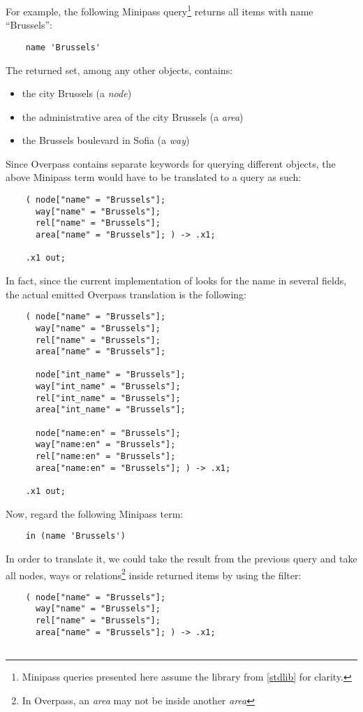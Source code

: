 \documentclass[main.tex]{subfiles}
\begin{document}
\begin{example}
For example, the following Minipass
query\footnote{
    Minipass queries presented here assume the library from \cref{stdlib}
    for clarity.
} returns all items with name ``Brussels'':
\begin{lstwrap}\begin{lstlisting}
    name 'Brussels'
\end{lstlisting}\end{lstwrap}
The returned set, among any other objects, contains:
\begin{itemize}
    \item the city Brussels (a \emph{node})
    \item the administrative area of the city Brussels (a \emph{area})
    \item the Brussels boulevard in Sofia (a \emph{way})
\end{itemize}
Since Overpass contains separate keywords for querying different objects,
the above Minipass term would have to be translated to a query as such:
\begin{lstwrap}\begin{lstlisting}
    ( node["name" = "Brussels"];
      way["name" = "Brussels"];
      rel["name" = "Brussels"];
      area["name" = "Brussels"]; ) -> .x1;

    .x1 out;
\end{lstlisting}\end{lstwrap}
In fact, since the current implementation of  looks for the
name in several fields, the actual emitted Overpass translation is the
following:
\begin{lstwrap}\begin{lstlisting}
    ( node["name" = "Brussels"];
      way["name" = "Brussels"];
      rel["name" = "Brussels"];
      area["name" = "Brussels"];

      node["int_name" = "Brussels"];
      way["int_name" = "Brussels"];
      rel["int_name" = "Brussels"];
      area["int_name" = "Brussels"];

      node["name:en" = "Brussels"];
      way["name:en" = "Brussels"];
      rel["name:en" = "Brussels"];
      area["name:en" = "Brussels"]; ) -> .x1;

    .x1 out;
\end{lstlisting}\end{lstwrap}

Now, regard the following Minipass term:
\begin{lstwrap}\begin{lstlisting}
    in (name 'Brussels')
\end{lstlisting}\end{lstwrap}
In order to translate it, we could take the result from the previous query
and take all nodes, ways or relations\footnote{In Overpass, an \emph{area} may
    not be inside another \emph{area}} inside returned items by using the
 filter:
\begin{lstwrap}\begin{lstlisting}
    ( node["name" = "Brussels"];
      way["name" = "Brussels"];
      rel["name" = "Brussels"];
      area["name" = "Brussels"]; ) -> .x1;


\end{lstlisting}
\end{lstwrap}
\end{example}
\end{document}
